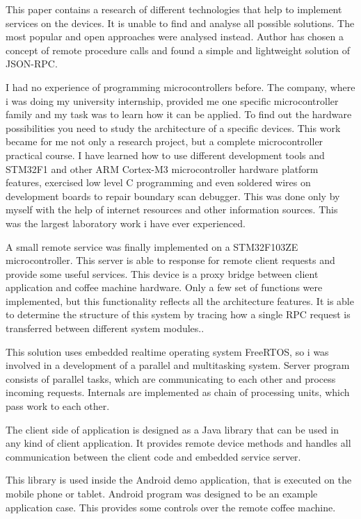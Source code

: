 This paper contains a research of different technologies that help to implement
services on the devices.
It is unable to find and analyse all possible solutions. The most popular and
open approaches were analysed instead. 
Author has chosen a concept of remote procedure calls and found a simple
and lightweight solution of JSON-RPC. 

I had no experience of programming microcontrollers before. The company, where i
was doing my university internship, provided me one specific microcontroller
family and my task was to learn how it can be applied. To find out the
hardware possibilities you need to study the  architecture of a specific
devices.
This work became for me not only a research project, but  a complete
microcontroller practical course.
I have learned how to use different development tools and STM32F1 and other ARM
Cortex-M3 microcontroller hardware platform features, exercised low level C
programming and even soldered wires on development boards to repair boundary
scan debugger.
This was done only by myself with the help of internet resources
and other information sources.
This was the largest laboratory work i have ever experienced.

A small remote service was finally implemented on a STM32F103ZE microcontroller. 
This server is able to response for remote client requests and provide some
useful services.
This device is a proxy bridge between client application and coffee machine
hardware.
Only a few set of functions were implemented, but this functionality reflects all
the architecture features.
It is able to determine the structure of this system by tracing how a
single RPC request is transferred between different system modules..

This solution uses embedded realtime operating system FreeRTOS, so i was
involved in a development of a parallel and multitasking system. 
Server program consists of parallel tasks, which are communicating to each other
and process incoming requests. Internals are implemented as chain of
processing units, which pass work to each other.

The client side of application is designed as a Java library that can be used
in any kind of client application. It provides remote device methods and handles
all communication between the client code and embedded service server.

This library  is used inside the Android demo application, that is executed on
the mobile phone or tablet.
Android program was designed to be an example application case. 
This provides some controls over the remote coffee machine. 


